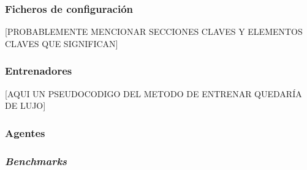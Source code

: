 \subsubsection{Ficheros de configuración}
[PROBABLEMENTE MENCIONAR SECCIONES CLAVES Y ELEMENTOS CLAVES QUE SIGNIFICAN]

\subsubsection{Entrenadores}

[AQUI UN PSEUDOCODIGO DEL METODO DE ENTRENAR QUEDARÍA DE LUJO]

\subsubsection{Agentes}

\subsubsection{\textit{Benchmarks}}